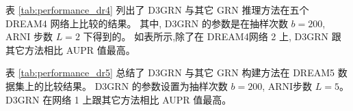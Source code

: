 表 \ref{tab:performance_dr4} 列出了 D3GRN 与其它 GRN 推理方法在五个 DREAM4 网络上比较的结果。
其中, D3GRN 的参数是在抽样次数 $b=200$, ARNI 步数 $L=2$ 下得到的。
如表所示,除了在 DREAM4网络 2 上, D3GRN 跟其它方法相比 AUPR 值最高。

表 \ref{tab:performance_dr5} 总结了 D3GRN 与其它 GRN 构建方法在 DREAM5 数据集上的比较结果。
D3GRN 的参数设置为抽样次数 $b=200$, ARNI步数 $L=5$。
D3GRN 在网络 1 上跟其它方法相比 AUPR 值最高。


